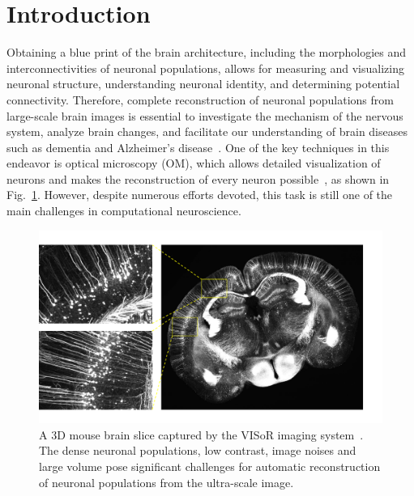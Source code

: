 \section{Introduction}
\label{sec:introduction}

Obtaining a blue print of the brain architecture, including the morphologies and interconnectivities of neuronal populations, allows for measuring and visualizing neuronal structure, understanding neuronal identity, and determining potential connectivity.
Therefore, complete reconstruction of neuronal populations from large-scale brain images is essential to investigate the mechanism of the nervous system, analyze brain changes, and facilitate our understanding of brain diseases such as dementia and Alzheimer's disease~\cite{Petrella2003, Giorgio2013}.
One of the key techniques in this endeavor is optical microscopy (OM), which allows detailed visualization of neurons and makes the reconstruction of every neuron possible~\cite{Senft2011}, as shown in Fig.~\ref{fig:brain}.
However, despite numerous efforts devoted, this task is still one of the main challenges in computational neuroscience.

\begin{figure}[t]
	\centering
	\includegraphics[width=1\columnwidth]{./Illustrations/brain2.pdf}
	\caption{A 3D mouse brain slice captured by the VISoR imaging system~\cite{Wang2019}. The dense neuronal populations, low contrast, image noises and large volume pose significant challenges for automatic reconstruction of neuronal populations from the ultra-scale image.}	
	\label{fig:brain}
\end{figure}

